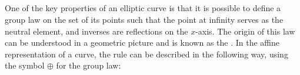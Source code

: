 \subsection{}
\label{sec:affine_group_law}
One of the key properties of an elliptic curve is that it is possible to define a group law on the set of its points such that the point at infinity serves as the neutral element, and inverses are reflections on the $x$-axis. The origin of this law can be understood in a geometric picture and is known as the . In the affine representation of a  curve, the rule can be described in the following way, using the symbol $\oplus$ for the group law:

